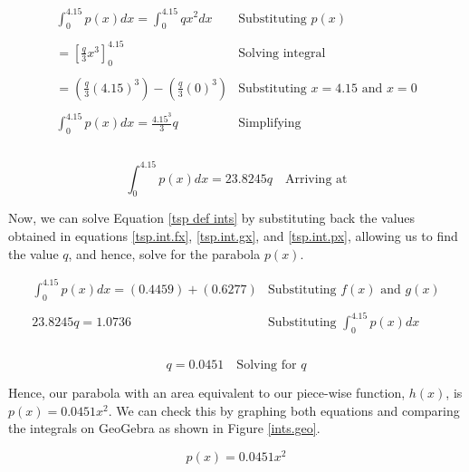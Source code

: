 \documentclass[12pt]{article}
\begin{document}
$$
\begin{array}{l|c}
   \int_{0}^{4.15}{p(x)}dx = \int_{0}^{4.15}{qx^2}dx & \text{Substituting } p(x) \\ \\
    = \left[   \frac{q}{3}x^3   \right]_0^{4.15} & \text{Solving integral} \\ \\
    = (\frac{q}{3}(4.15)^3) - (\frac{q}{3}(0)^3) & \text{Substituting } x=4.15 \text{ and } x=0 \\ \\
    \int_{0}^{4.15}{p(x)}dx = \frac{4.15^3}{3}q & \text{Simplifying} \\ \\
 \end{array}
$$

\begin{equation}\label{tsp.int.px}
    \boxed{\int_{0}^{4.15}{p(x)}dx = 23.8245q}  \quad \text{Arriving at}
\end{equation}

Now, we can solve Equation \ref{tsp def ints} by substituting back the values obtained in equations \ref{tsp.int.fx}, \ref{tsp.int.gx}, and \ref{tsp.int.px}, allowing us to find the value $q$, and hence, solve for the parabola $p(x)$.

$$
\begin{array}{l|c}
    \int_{0}^{4.15}{p(x)}dx = (0.4459) +(0.6277) & \text{Substituting } f(x) \text{ and } g(x) \\ \\
    23.8245q = 1.0736 & \text{Substituting } \int_{0}^{4.15}{p(x)}dx \\ \\
 \end{array}
$$

\vspace{-5mm}

\begin{equation}\label{tsp.int}
    \boxed{q = 0.0451}  \quad \text{Solving for } q
\end{equation}

Hence, our parabola with an area equivalent to our piece-wise function, $h(x)$, is $p(x)=0.0451x^2$. We can check this by graphing both equations and comparing the integrals on GeoGebra as shown in Figure \ref{ints.geo}.

\vspace{-10mm}

\begin{equation}\label{p(x)}
    \boxed{p(x)=0.0451x^2}
\end{equation}
\end{document}
